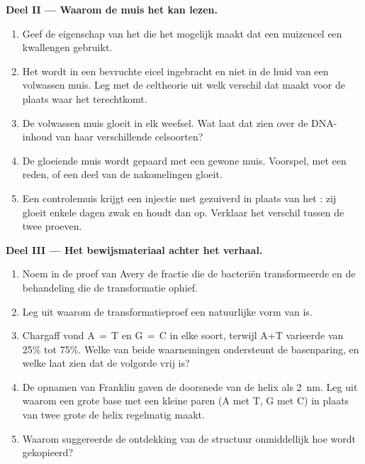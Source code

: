 \begin{problem}
\medskip
\noindent\textbf{Deel II --- Waarom de muis het kan lezen.}
\begin{enumerate}[resume]
  \item Geef de eigenschap van het  die het mogelijk maakt dat een
        muizencel een kwallengen gebruikt.
  \item Het  wordt in een bevruchte eicel ingebracht en niet in de
        huid van een volwassen muis. Leg met de celtheorie uit welk
        verschil dat maakt voor de plaats waar het  terechtkomt.
  \item De volwassen muis gloeit in elk weefsel. Wat laat dat zien over
        de DNA-inhoud van haar verschillende celsoorten?
  \item De gloeiende muis wordt gepaard met een gewone muis. Voorspel,
        met een reden, of een deel van de nakomelingen gloeit.
  \item Een controlemuis krijgt een injectie met gezuiverd  in
        plaats van het : zij gloeit enkele dagen zwak en houdt dan
        op. Verklaar het verschil tussen de twee proeven.
\end{enumerate}

\medskip
\noindent\textbf{Deel III --- Het bewijsmateriaal achter het verhaal.}
\begin{enumerate}[resume]
  \item Noem in de proef van Avery de fractie die de bacteriën
        transformeerde en de behandeling die de transformatie ophief.
  \item Leg uit waarom de transformatieproef een natuurlijke vorm van
         is.
  \item Chargaff vond A$\,=\,$T en G$\,=\,$C in elke soort, terwijl A+T
        varieerde van 25\% tot 75\%. Welke van beide waarnemingen
        ondersteunt de basenparing, en welke laat zien dat de volgorde
        vrij is?
  \item De opnamen van Franklin gaven de doorsnede van de helix als
        \qty{2}{nm}. Leg uit waarom een grote base met een kleine paren
        (A met T, G met C) in plaats van twee grote de helix regelmatig
        maakt.
  \item Waarom suggereerde de ontdekking van de structuur onmiddellijk
        hoe  wordt gekopieerd?
\end{enumerate}


\end{problem}
